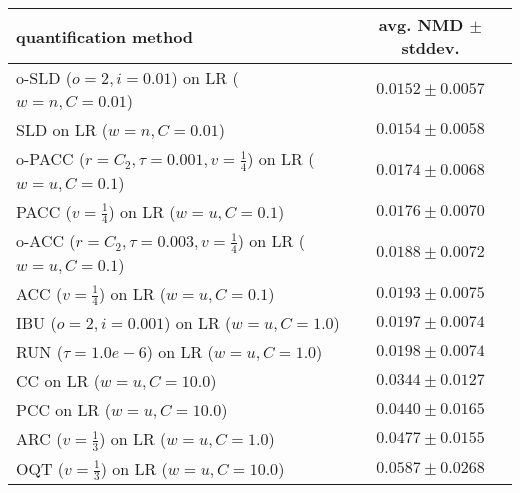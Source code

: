 \begin{tabular}{lc}
  \toprule
  quantification method & avg. NMD $\pm$ stddev. \\
  \midrule
  o-SLD ($o=2, i=0.01$) on LR ($w=n, C=0.01$) & $\mathbf{0.0152 \pm 0.0057}$ \\
  SLD on LR ($w=n, C=0.01$) & $0.0154 \pm 0.0058$ \\
  o-PACC ($r=C_2, \tau=0.001, v=\frac{1}{4}$) on LR ($w=u, C=0.1$) & $0.0174 \pm 0.0068$ \\
  PACC ($v=\frac{1}{4}$) on LR ($w=u, C=0.1$) & $0.0176 \pm 0.0070$ \\
  o-ACC ($r=C_2, \tau=0.003, v=\frac{1}{4}$) on LR ($w=u, C=0.1$) & $0.0188 \pm 0.0072$ \\
  ACC ($v=\frac{1}{4}$) on LR ($w=u, C=0.1$) & $0.0193 \pm 0.0075$ \\
  IBU ($o=2, i=0.001$) on LR ($w=u, C=1.0$) & $0.0197 \pm 0.0074$ \\
  RUN ($\tau=1.0e-6$) on LR ($w=u, C=1.0$) & $0.0198 \pm 0.0074$ \\
  CC on LR ($w=u, C=10.0$) & $0.0344 \pm 0.0127$ \\
  PCC on LR ($w=u, C=10.0$) & $0.0440 \pm 0.0165$ \\
  ARC ($v=\frac{1}{3}$) on LR ($w=u, C=1.0$) & $0.0477 \pm 0.0155$ \\
  OQT ($v=\frac{1}{3}$) on LR ($w=u, C=10.0$) & $0.0587 \pm 0.0268$ \\
  \bottomrule
\end{tabular}
